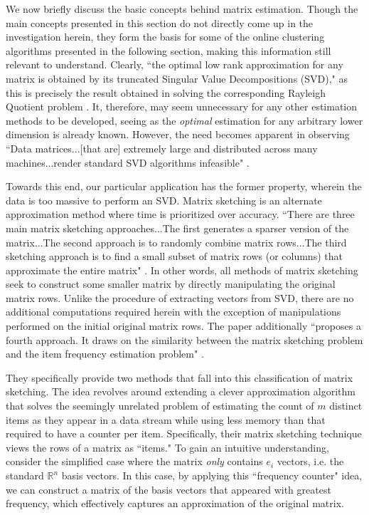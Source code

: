 \documentclass{article}
\begin{document}
We now briefly discuss the basic concepts behind matrix estimation. Though the main concepts presented in this section do not directly come up in the investigation herein, they form the basis for some of the online clustering algorithms presented in the following section, making this information still relevant to understand. Clearly, ``the optimal low rank approximation for any matrix is obtained by its truncated Singular Value Decompositions (SVD)," as this is precisely the result obtained in solving the corresponding Rayleigh Quotient problem \cite{sketch}. It, therefore, may seem unnecessary for any other estimation methods to be developed, seeing as the \textit{optimal} estimation for any arbitrary lower dimension is already known. However, the need becomes apparent in observing ``Data matrices...[that are] extremely large and distributed across many machines...render standard SVD algorithms infeasible" \cite{sketch}.

Towards this end, our particular application has the former property, wherein the data is too massive to perform an SVD. Matrix sketching is an alternate approximation method where time is prioritized over accuracy. ``There are three main matrix sketching approaches...The first generates a sparser version of the matrix...The second approach is to randomly combine matrix rows...The third sketching approach is to find a small subset of matrix rows (or columns) that approximate the entire matrix" \cite{sketch}. In other words, all methods of matrix sketching seek to construct some smaller matrix by directly manipulating the original matrix rows. Unlike the procedure of extracting vectors from SVD, there are no additional computations required herein with the exception of manipulations performed on the initial original matrix rows. The paper additionally ``proposes a fourth approach. It draws on the similarity between the matrix sketching problem and the item frequency estimation problem" \cite{sketch}.

They specifically provide two methods that fall into this classification of matrix sketching. The idea revolves around extending a clever approximation algorithm that solves the seemingly unrelated problem of estimating the count of $m$ distinct items as they appear in a data stream while using less memory than that required to have a counter per item. Specifically, their matrix sketching technique views the rows of a matrix as ``items." To gain an intuitive understanding, consider the simplified case where the matrix \textit{only} contains $e_i$ vectors, i.e. the standard $\mathbb{R}^n$ basis vectors. In this case, by applying this ``frequency counter" idea, we can construct a matrix of the basis vectors that appeared with greatest frequency, which effectively captures an approximation of the original matrix.
\end{document}
